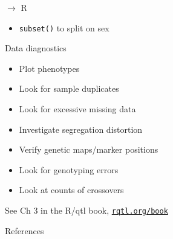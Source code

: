 \documentclass[12pt]{article}
\newcommand{\headsize}{\fontsize{35}{35} \selectfont}
\newcommand{\smallsize}{\fontsize{25}{30} \selectfont}
\begin{document}
\newpage

\headsize \color{myyellow}
$\boldsymbol{\rightarrow}$ R

\vspace{3cm}

\color{mywhite} \smallsize

\hfill \begin{minipage}[t]{9.5in}
\begin{itemize}
\itemsep24pt
\item \verb|subset()| to split on sex
\end{itemize} \end{minipage}



\newpage

\headsize \color{myyellow}
\hfill \begin{minipage}{5.75in}
\centering
Data diagnostics
\end{minipage}

\vspace{3cm}

\color{mywhite} \smallsize

\hfill \begin{minipage}[t]{9.5in}
\begin{itemize}
\itemsep18pt
\item Plot phenotypes
\item Look for sample duplicates
\item Look for excessive missing data
\item Investigate segregation distortion
\item Verify genetic maps/marker positions
\item Look for genotyping errors
\item Look at counts of crossovers
\end{itemize} \end{minipage}

\vspace{15mm}

\centerline{\color{myblue} See Ch 3 in the R/qtl book,
  \href{http://rqtl.org/book}{\tt rqtl.org/book}}





\newpage

\headsize \color{myyellow}
\hfill \begin{minipage}{5.75in}
\centering
References
\end{minipage}

\vspace{15mm}
\end{document}
